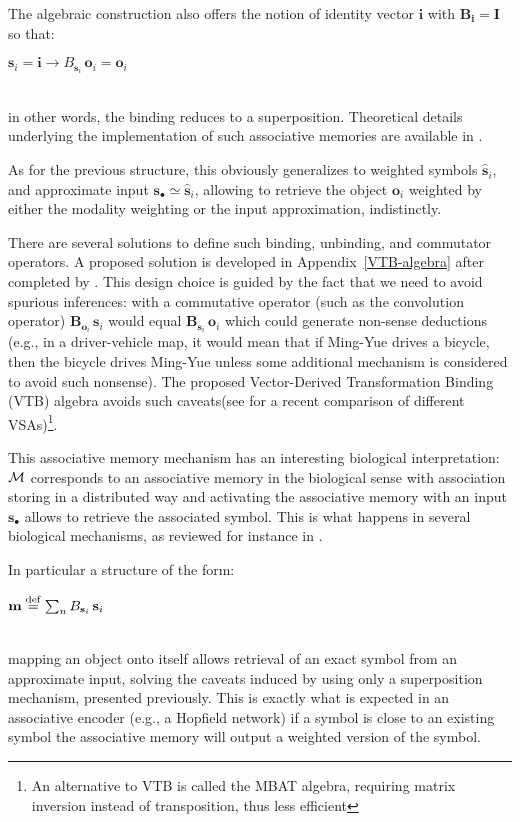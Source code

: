 \documentclass[sn-mathphys]{sn-jnl}
\newcommand{\defq}{\stackrel {\rm def}{=}}
\newcommand{\eqline}[1]{~\vspace{0.1cm}\\\centerline{$#1$}\vspace{0.1cm}\\}
\begin{document}
The algebraic construction also offers the notion of identity vector $\mathbf{i}$ with $\mathbf{B_{\mathbf{i}}} = \mathbf{I}$ so that:
\eqline{\mathbf{s}_i = \mathbf{i} \rightarrow B_{\mathbf{s}_i} \, \mathbf{o}_i = \mathbf{o}_i}
in other words, the binding reduces to a superposition. Theoretical details underlying the implementation of such associative memories are available in \cite{stewart_biologically_2011}.

As for the previous structure, this obviously generalizes to weighted symbols $\hat{\mathbf{s}}_i$, and approximate input
$\mathbf{s}_\bullet \simeq \hat{\mathbf{s}}_i$, allowing to retrieve the object $\mathbf{o}_i$ weighted by either the modality weighting or the input approximation, indistinctly.

There are several solutions to define such binding, unbinding, and commutator operators. A proposed solution is developed in Appendix~\ref{VTB-algebra} after \cite{gosmann_vector-derived_2019} completed by \cite{mercier_ontology_2021}. This design choice is guided by the fact that we need to avoid spurious inferences: with a commutative operator (such as the convolution operator) $\mathbf{B}_{\mathbf{o}_i} \, \mathbf{s}_i$ would equal $\mathbf{B}_{\mathbf{s}_i} \, \mathbf{o}_i$ which could generate non-sense deductions (e.g., in a driver-vehicle map, it would mean that if Ming-Yue drives a bicycle, then the bicycle drives Ming-Yue unless some additional mechanism is considered to avoid such nonsense). The proposed Vector-Derived Transformation Binding (VTB) algebra avoids such caveats(see \cite{schlegel_comparison_2020} for a recent comparison of different VSAs)\footnote{An alternative to VTB is called the MBAT algebra, requiring matrix inversion instead of transposition, thus less efficient}. 

This associative memory mechanism has an interesting biological interpretation: ${\cal M}$ corresponds to an associative memory in the biological sense with association storing in a distributed way and activating the associative memory with an input $\mathbf{s}_\bullet$ allows to retrieve the associated symbol. This is what happens in several biological mechanisms, as reviewed for instance in \cite{eichenbaum_memory_2017}. 

In particular a structure of the form:
\eqline{\mathbf{m} \defq \sum_n B_{\mathbf{s}_i} \, \mathbf{s}_i}
mapping an object onto itself allows retrieval of an exact symbol from an approximate input, solving the caveats induced by using only a superposition mechanism, presented previously. This is exactly what is expected in an associative encoder (e.g., a Hopfield network) if a symbol is close to an existing symbol the associative memory will output a weighted version of the symbol.
\end{document}
